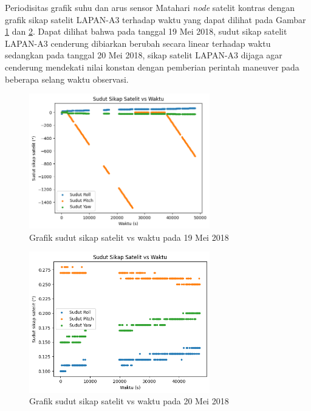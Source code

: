 Periodisitas grafik suhu dan arus sensor Matahari \textit{node} satelit kontras
dengan grafik sikap satelit LAPAN-A3 terhadap waktu yang dapat dilihat pada
Gambar \ref{fig:rawangle19} dan \ref{fig:rawangle20}. Dapat dilihat bahwa pada
tanggal 19 Mei 2018, sudut sikap satelit LAPAN-A3 cenderung dibiarkan berubah
secara linear terhadap waktu sedangkan pada tanggal 20 Mei 2018, sikap satelit
LAPAN-A3 dijaga agar cenderung mendekati nilai konstan dengan pemberian
perintah maneuver pada beberapa selang waktu observasi.

\begin{figure}[H]
\setlength{}
\begin{center}
\includegraphics[width=0.7\textwidth]{fig/raw_angle_2018-05-19.png}
	\caption{Grafik sudut sikap satelit vs waktu pada 19 Mei 2018}
\label{fig:rawangle19}
\end{center}
\end{figure}

\begin{figure}[H]
\setlength{}
\begin{center}
\includegraphics[width=0.7\textwidth]{fig/raw_angle_2018-05-20.png}
	\caption{Grafik sudut sikap satelit vs waktu pada 20 Mei 2018}
\label{fig:rawangle20}
\end{center}
\end{figure}

